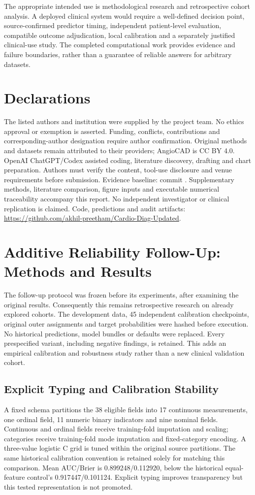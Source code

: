 \documentclass[conference,10pt]{IEEEtran}
\begin{document}
The appropriate intended use is methodological research and retrospective cohort analysis. A deployed clinical system would require a well-defined decision point, source-confirmed predictor timing, independent patient-level evaluation, compatible outcome adjudication, local calibration and a separately justified clinical-use study. The completed computational work provides evidence and failure boundaries, rather than a guarantee of reliable answers for arbitrary datasets.

\section*{Declarations}
The listed authors and institution were supplied by the project team. No ethics approval or exemption is asserted. Funding, conflicts, contributions and corresponding-author designation require author confirmation. Original methods and datasets remain attributed to their providers; AngioCAD is CC BY 4.0. OpenAI ChatGPT/Codex assisted coding, literature discovery, drafting and chart preparation. Authors must verify the content, tool-use disclosure and venue requirements before submission.
Evidence baseline: commit . Supplementary methods, literature comparison, figure inputs and executable numerical traceability accompany this report. No independent investigator or clinical replication is claimed. Code, predictions and audit artifacts: \url{https://github.com/akhil-preetham/Cardio-Diag-Updated}.

\setcounter{table}{4}
\section{Additive Reliability Follow-Up: Methods and Results}
The follow-up protocol was frozen before its experiments, after examining the original results. Consequently this remains retrospective research on already explored cohorts. The development data, 45 independent calibration checkpoints, original outer assignments and target probabilities were hashed before execution. No historical predictions, model bundles or defaults were replaced. Every prespecified variant, including negative findings, is retained. This adds an empirical calibration and robustness study rather than a new clinical validation cohort.

\subsection{Explicit Typing and Calibration Stability}
A fixed schema partitions the 38 eligible fields into 17 continuous measurements, one ordinal field, 11 numeric binary indicators and nine nominal fields. Continuous and ordinal fields receive training-fold imputation and scaling; categories receive training-fold mode imputation and fixed-category encoding. A three-value logistic C grid is tuned within the original source partitions. The same historical calibration convention is retained solely for matching this comparison. Mean AUC/Brier is 0.899248/0.112920, below the historical equal-feature control's 0.917447/0.101124. Explicit typing improves transparency but this tested representation is not promoted.
\end{document}
